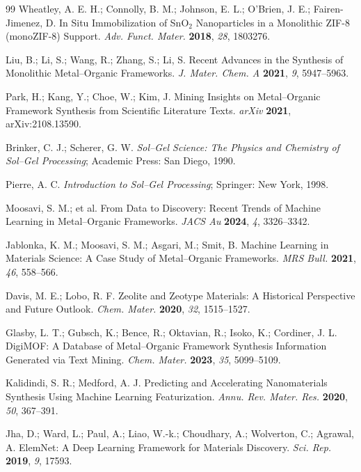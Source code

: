 \documentclass[12pt,a4paper]{article}
\begin{document}
\begin{thebibliography}{99}
 Wheatley, A. E. H.; Connolly, B. M.; Johnson, E. L.; O'Brien, J. E.; Fairen-Jimenez, D. In Situ Immobilization of SnO$_2$ Nanoparticles in a Monolithic ZIF-8 (monoZIF-8) Support. \textit{Adv. Funct. Mater.} \textbf{2018}, \textit{28}, 1803276.


 Liu, B.; Li, S.; Wang, R.; Zhang, S.; Li, S. Recent Advances in the Synthesis of Monolithic Metal–Organic Frameworks. \textit{J. Mater. Chem. A} \textbf{2021}, \textit{9}, 5947–5963.

 Park, H.; Kang, Y.; Choe, W.; Kim, J. Mining Insights on Metal--Organic Framework Synthesis from Scientific Literature Texts. \textit{arXiv} \textbf{2021}, arXiv:2108.13590.

 Brinker, C. J.; Scherer, G. W. \textit{Sol--Gel Science: The Physics and Chemistry of Sol--Gel Processing}; Academic Press: San Diego, 1990.

 Pierre, A. C. \textit{Introduction to Sol--Gel Processing}; Springer: New York, 1998.

 Moosavi, S. M.; et al. From Data to Discovery: Recent Trends of Machine Learning in Metal–Organic Frameworks. \textit{JACS Au} \textbf{2024}, \textit{4}, 3326–3342.

 Jablonka, K. M.; Moosavi, S. M.; Asgari, M.; Smit, B. Machine Learning in Materials Science: A Case Study of Metal–Organic Frameworks. \textit{MRS Bull.} \textbf{2021}, \textit{46}, 558–566.

 Davis, M. E.; Lobo, R. F. Zeolite and Zeotype Materials: A Historical Perspective and Future Outlook. \textit{Chem. Mater.} \textbf{2020}, \textit{32}, 1515–1527.

 Glasby, L. T.; Gubsch, K.; Bence, R.; Oktavian, R.; Isoko, K.; Cordiner, J. L. DigiMOF: A Database of Metal--Organic Framework Synthesis Information Generated via Text Mining. \textit{Chem. Mater.} \textbf{2023}, \textit{35}, 5099--5109.

 Kalidindi, S. R.; Medford, A. J. Predicting and Accelerating Nanomaterials Synthesis Using Machine Learning Featurization. \textit{Annu. Rev. Mater. Res.} \textbf{2020}, \textit{50}, 367–391.

 Jha, D.; Ward, L.; Paul, A.; Liao, W.-k.; Choudhary, A.; Wolverton, C.; Agrawal, A. ElemNet: A Deep Learning Framework for Materials Discovery. \textit{Sci. Rep.} \textbf{2019}, \textit{9}, 17593.


\end{thebibliography}
\end{document}
